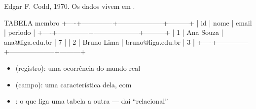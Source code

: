 \begin{frame}[fragile]{}
  \vspace{0.3em}
  {\lexendlight\small Edgar F. Codd, 1970. Os dados vivem em .}

  \vspace{0.8em}
  \begin{sql}
TABELA membro
+----+--------------+--------------------+---------+
| id | nome         | email              | periodo |
+----+--------------+--------------------+---------+
|  1 | Ana Souza    | ana@liga.edu.br    |       7 |
|  2 | Bruno Lima   | bruno@liga.edu.br  |       3 |
+----+--------------+--------------------+---------+
  \end{sql}

  \vspace{0.5em}
  \begin{itemize}
    \item {} (registro): uma ocorrência do mundo real
    \item {} (campo): uma característica dela, com 
    \item {}: o que liga uma tabela a outra — daí ``relacional''
  \end{itemize}

\end{frame}

